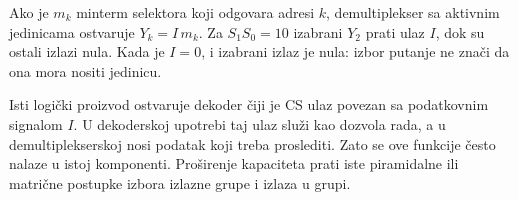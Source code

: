 
Ako je \(m_k\) minterm selektora koji odgovara adresi \(k\), demultiplekser sa aktivnim jedinicama ostvaruje \(Y_k=I\,m_k\). Za \(S_1S_0=10\) izabrani \(Y_2\) prati ulaz \(I\), dok su ostali izlazi nula. Kada je \(I=0\), i izabrani izlaz je nula: izbor putanje ne znači da ona mora nositi jedinicu.

Isti logički proizvod ostvaruje dekoder čiji je CS ulaz povezan sa podatkovnim signalom \(I\). U dekoderskoj upotrebi taj ulaz služi kao dozvola rada, a u demultiplekserskoj nosi podatak koji treba proslediti. Zato se ove funkcije često nalaze u istoj komponenti. Proširenje kapaciteta prati iste piramidalne ili matrične postupke izbora izlazne grupe i izlaza u grupi.
